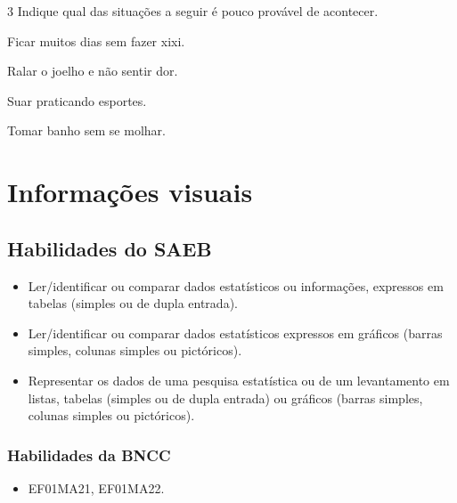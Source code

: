 \num{3} Indique qual das situações a seguir é pouco provável de acontecer.

\begin{escolha}[itemsep=-5pt]
\item Ficar muitos dias sem fazer xixi.

\item Ralar o joelho e não sentir dor.

\item Suar praticando esportes.

\item Tomar banho sem se molhar.
\end{escolha}


\chapter{Informações visuais}


\vspace*{-1.5cm}

\section*{Habilidades do SAEB}

\begin{itemize}
\item Ler/identificar ou comparar dados estatísticos ou informações, expressos em tabelas (simples ou de dupla entrada).

\item Ler/identificar ou comparar dados estatísticos expressos em gráficos (barras simples, colunas simples ou pictóricos).

\item Representar os dados de uma pesquisa estatística ou de um levantamento
em listas, tabelas (simples ou de dupla entrada) ou gráficos (barras
simples, colunas simples ou pictóricos).
\end{itemize}

\subsection{Habilidades da BNCC}

\begin{itemize}
	\item EF01MA21, EF01MA22.
\end{itemize}

